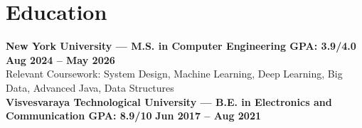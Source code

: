 \documentclass[10pt]{article}
\begin{document}
\section{Education}
\footnotesize{
\textbf{New York University --- M.S. in Computer Engineering \textbar{} GPA: 3.9/4.0} \hfill \textbf{Aug 2024 -- May 2026} \\
Relevant Coursework: System Design, Machine Learning, Deep Learning, Big Data, Advanced Java, Data Structures \\
\vspace{1pt}
\textbf{Visvesvaraya Technological University --- B.E. in Electronics and Communication \textbar{} GPA: 8.9/10} \hfill \textbf{Jun 2017 -- Aug 2021}
}
\end{document}
